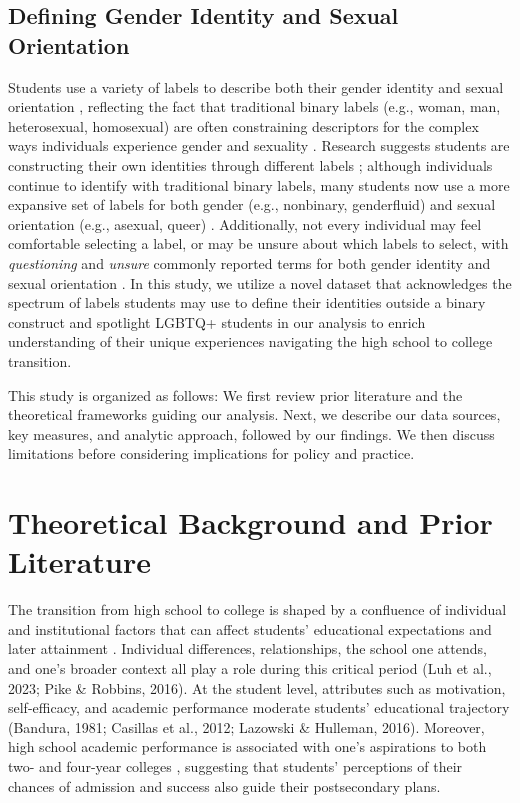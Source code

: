 \subsection{Defining Gender Identity and Sexual Orientation}\label{defining-gender-identity-and-sexual-orientation}

Students use a variety of labels to describe both their gender identity
and sexual orientation \citep{callis2014a, galupo2015a}, reflecting
the fact that traditional binary labels (e.g., woman, man, heterosexual,
homosexual) are often constraining descriptors for the complex ways
individuals experience gender and sexuality \citep{hammack2022a, morgan2013a}. Research suggests students are constructing their own
identities through different labels \citep{watson2020a, white2018a}; although individuals continue to identify with traditional binary
labels, many students now use a more expansive set of labels for both
gender (e.g., nonbinary, genderfluid) and sexual orientation (e.g.,
asexual, queer) \citep{beemyn2022a, hammack2022a}. Additionally, not
every individual may feel comfortable selecting a label, or may be
unsure about which labels to select, with \emph{questioning} and \emph{unsure}
commonly reported terms for both gender identity and sexual orientation
\citep{watson2020a, white2018a}. In this study, we utilize a
novel dataset that acknowledges the spectrum of labels students may use
to define their identities outside a binary construct and spotlight
LGBTQ+ students in our analysis to enrich understanding of their unique
experiences navigating the high school to college transition.

This study is organized as follows: We first review prior literature and
the theoretical frameworks guiding our analysis. Next, we describe our
data sources, key measures, and analytic approach, followed by our
findings. We then discuss limitations before considering implications
for policy and practice.

\section{Theoretical Background and Prior Literature}\label{theoretical-background-and-prior-literature}

The transition from high school to college is shaped by a confluence of
individual and institutional factors that can affect students'
educational expectations and later attainment \citep{kurlaender2019a}.
Individual differences, relationships, the school one attends, and one's
broader context all play a role during this critical period (Luh et al.,
2023; Pike \& Robbins, 2016). At the student level, attributes such as
motivation, self-efficacy, and academic performance moderate students'
educational trajectory (Bandura, 1981; Casillas et al., 2012; Lazowski \&
Hulleman, 2016). Moreover, high school academic performance is
associated with one's aspirations to both two- and four-year colleges
\citep{desjardins2019a}, suggesting that students' perceptions of
their chances of admission and success also guide their postsecondary
plans.

